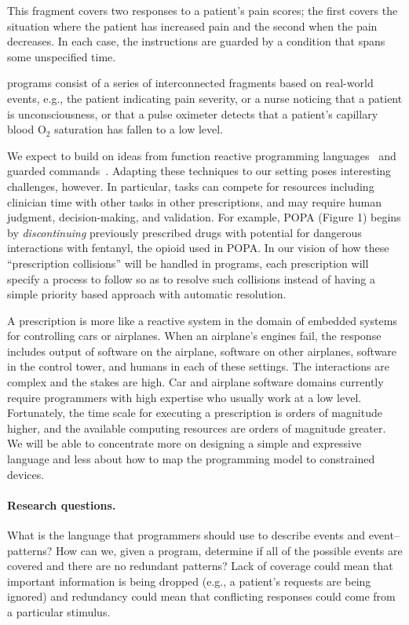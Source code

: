 This fragment covers two responses to a patient's pain scores; the
first covers the situation where the patient has increased pain and
the second when the pain decreases. In each case, the instructions are
guarded by a condition that spans some unspecified time.

\poppl{} programs consist of a series of interconnected fragments
based on real-world events, e.g., the patient indicating pain
severity, or a nurse noticing that a patient is unconsciousness, or
that a pulse oximeter detects that a patient's capillary blood O$_2$
saturation has fallen to a low level.

We expect to build on ideas from function reactive programming
languages~\cite{frp} and guarded commands~\cite{guarded-commands}.
Adapting these techniques to our setting poses interesting challenges,
however. In particular, tasks can compete for resources including
clinician time with other tasks in other prescriptions, and may
require human judgment, decision-making, and validation. For example,
POPA (Figure 1) begins by \emph{discontinuing} previously prescribed
drugs with potential for dangerous interactions with fentanyl, the
opioid used in POPA. In our vision of how these ``prescription
collisions'' will be handled in \poppl{} programs, each prescription
will specify a process to follow so as to resolve such collisions
instead of having a simple priority based approach with automatic
resolution.

A prescription is more like a reactive system in the domain of
embedded systems for controlling cars or airplanes. When an airplane's
engines fail, the response includes output of software on the
airplane, software on other airplanes, software in the control tower,
and humans in each of these settings.  The interactions are complex
and the stakes are high. Car and airplane software domains currently
require programmers with high expertise who usually work at a low
level. Fortunately, the time scale for executing a prescription is
orders of magnitude higher, and the available computing resources are
orders of magnitude greater. We will be able to concentrate more on
designing a simple and expressive language and less about how to map
the programming model to constrained devices. 

\paragraph{Research questions.}
What is the language that \poppl{} programmers should use to describe
events and event–patterns? How can we, given a \poppl{} program,
determine if all of the possible events are covered and there are no
redundant patterns? Lack of coverage could mean that important
information is being dropped (e.g., a patient's requests are being
ignored) and redundancy could mean that conflicting responses could
come from a particular stimulus.

